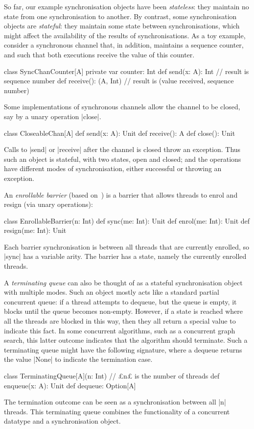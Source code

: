 So far, our example synchronisation objects have been \emph{stateless}: they
maintain no state from one synchronisation to another.  By contrast, some
synchronisation objects are \emph{stateful}: they maintain some state between
synchronisations, which might affect the availability of the results of
synchronisations.  As a toy example, consider a synchronous channel that, in
addition, maintains a sequence counter, and such that both executions receive
the value of this counter.
\begin{scala}
class SyncChanCounter[A]{
  private var counter: Int
  def send(x: A): Int      // result is sequence number
  def receive(): (A, Int)  // result is (value received, sequence number)
}
\end{scala}


Some implementations of synchronous channels allow the channel to be closed,
say by a unary operation |close|. 
\begin{scala}
class CloseableChan[A]{
  def send(x: A): Unit
  def receive(): A
  def close(): Unit
}
\end{scala} 
%
Calls to |send| or |receive| after the channel is closed throw an exception.
Thus such an object is stateful, with two states, open and closed; and the
operations have different modes of synchronisation, either successful or
throwing an exception.


An \emph{enrollable barrier} (based on~\cite{alting-barrier}) is a barrier
that allows threads to enrol and resign (via unary operations):
%
\begin{scala}
class EnrollableBarrier(n: Int){
  def sync(me: Int): Unit
  def enrol(me: Int): Unit
  def resign(me: Int): Unit
}
\end{scala} 
%
Each barrier synchronisation is between all threads that are currently
enrolled, so |sync| has a variable arity.  The barrier has a state, namely the
currently enrolled threads.

A \emph{terminating queue} can also be thought of as a stateful
synchronisation object with multiple modes.  Such an object mostly acts like a
standard partial concurrent queue: if a thread attempts to dequeue, but the
queue is empty, it blocks until the queue becomes non-empty.  However, if a
state is reached where all the threads are blocked in this way, then they all
return a special value to indicate this fact.  In some concurrent algorithms,
such as a concurrent graph search, this latter outcome indicates that the
algorithm should terminate.  Such a terminating queue might have the following
signature, where a dequeue returns the value |None| to indicate the
termination case.
%
\begin{scala}
class TerminatingQueue[A](n: Int){ // £n£ is the number of threads   
  def enqueue(x: A): Unit
  def dequeue: Option[A]
}
\end{scala} 
%
The termination outcome can be seen as a synchronisation between all |n|
threads.  This terminating queue combines the functionality of a
concurrent datatype and a synchronisation object.


